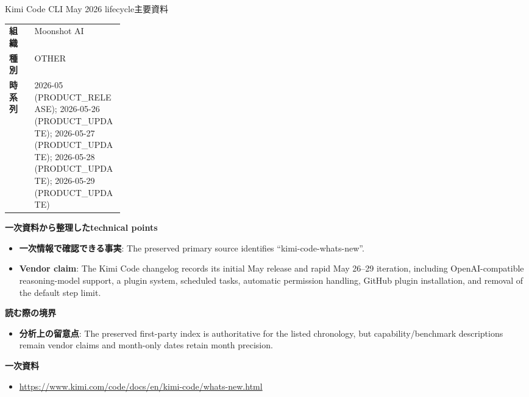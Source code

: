 \begin{technicalnote}{Kimi Code CLI May 2026 lifecycle}{主要資料}
\begin{tabularx}{\linewidth}{@{}>{\bfseries}p{0.22\linewidth}X@{}}
組織 & Moonshot AI \\
種別 & OTHER \\
時系列 & 2026-05 (PRODUCT\_RELEASE); 2026-05-26 (PRODUCT\_UPDATE); 2026-05-27 (PRODUCT\_UPDATE); 2026-05-28 (PRODUCT\_UPDATE); 2026-05-29 (PRODUCT\_UPDATE) \\
\end{tabularx}
\smallskip
{\bfseries 一次資料から整理したtechnical points}
\begin{itemize}[leftmargin=1.5em,itemsep=0.35em]
\item \textbf{一次情報で確認できる事実}: The preserved primary source identifies “kimi-code-whats-new”.
\item \textbf{Vendor claim}: The Kimi Code changelog records its initial May release and rapid May 26–29 iteration, including OpenAI-compatible reasoning-model support, a plugin system, scheduled tasks, automatic permission handling, GitHub plugin installation, and removal of the default step limit.
\end{itemize}
{\bfseries 読む際の境界}
\begin{itemize}[leftmargin=1.5em,itemsep=0.35em]
\item \textbf{分析上の留意点}: The preserved first-party index is authoritative for the listed chronology, but capability/benchmark descriptions remain vendor claims and month-only dates retain month precision.
\end{itemize}
{\bfseries 一次資料}
\begingroup\sloppy
\begin{itemize}[leftmargin=1.5em,itemsep=0.25em]
\item {\scriptsize\url{https://www.kimi.com/code/docs/en/kimi-code/whats-new.html}}
\end{itemize}
\endgroup
\end{technicalnote}
\medskip

